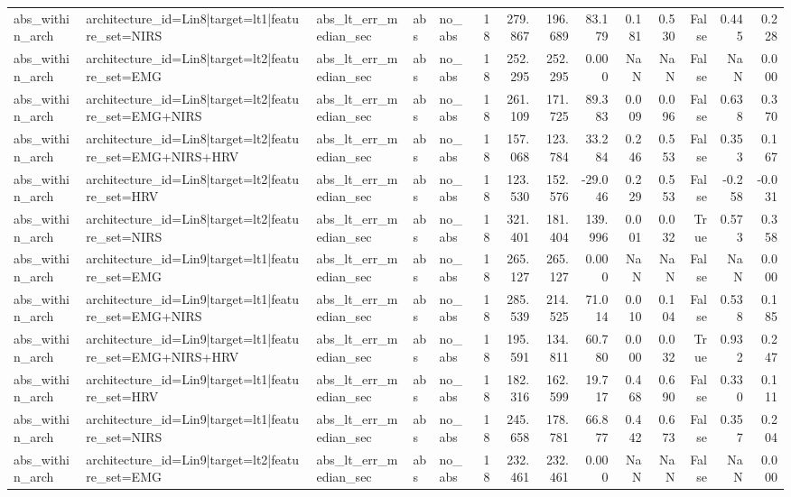 \begin{table}
\begin{tabular}{lllllrrrrrrrrr}
abs_within_arch & architecture_id=Lin8|target=lt1|feature_set=NIRS & abs_lt_err_median_sec & abs & no_abs & 18 & 279.867 & 196.689 & 83.179 & 0.181 & 0.530 & False & 0.445 & 0.228 \\
abs_within_arch & architecture_id=Lin8|target=lt2|feature_set=EMG & abs_lt_err_median_sec & abs & no_abs & 18 & 252.295 & 252.295 & 0.000 & NaN & NaN & False & NaN & 0.000 \\
abs_within_arch & architecture_id=Lin8|target=lt2|feature_set=EMG+NIRS & abs_lt_err_median_sec & abs & no_abs & 18 & 261.109 & 171.725 & 89.383 & 0.009 & 0.096 & False & 0.638 & 0.370 \\
abs_within_arch & architecture_id=Lin8|target=lt2|feature_set=EMG+NIRS+HRV & abs_lt_err_median_sec & abs & no_abs & 18 & 157.068 & 123.784 & 33.284 & 0.246 & 0.553 & False & 0.353 & 0.167 \\
abs_within_arch & architecture_id=Lin8|target=lt2|feature_set=HRV & abs_lt_err_median_sec & abs & no_abs & 18 & 123.530 & 152.576 & -29.046 & 0.229 & 0.553 & False & -0.258 & -0.031 \\
abs_within_arch & architecture_id=Lin8|target=lt2|feature_set=NIRS & abs_lt_err_median_sec & abs & no_abs & 18 & 321.401 & 181.404 & 139.996 & 0.001 & 0.032 & True & 0.573 & 0.358 \\
abs_within_arch & architecture_id=Lin9|target=lt1|feature_set=EMG & abs_lt_err_median_sec & abs & no_abs & 18 & 265.127 & 265.127 & 0.000 & NaN & NaN & False & NaN & 0.000 \\
abs_within_arch & architecture_id=Lin9|target=lt1|feature_set=EMG+NIRS & abs_lt_err_median_sec & abs & no_abs & 18 & 285.539 & 214.525 & 71.014 & 0.010 & 0.104 & False & 0.538 & 0.185 \\
abs_within_arch & architecture_id=Lin9|target=lt1|feature_set=EMG+NIRS+HRV & abs_lt_err_median_sec & abs & no_abs & 18 & 195.591 & 134.811 & 60.780 & 0.000 & 0.032 & True & 0.932 & 0.247 \\
abs_within_arch & architecture_id=Lin9|target=lt1|feature_set=HRV & abs_lt_err_median_sec & abs & no_abs & 18 & 182.316 & 162.599 & 19.717 & 0.468 & 0.690 & False & 0.330 & 0.111 \\
abs_within_arch & architecture_id=Lin9|target=lt1|feature_set=NIRS & abs_lt_err_median_sec & abs & no_abs & 18 & 245.658 & 178.781 & 66.877 & 0.442 & 0.673 & False & 0.357 & 0.204 \\
abs_within_arch & architecture_id=Lin9|target=lt2|feature_set=EMG & abs_lt_err_median_sec & abs & no_abs & 18 & 232.461 & 232.461 & 0.000 & NaN & NaN & False & NaN & 0.000 \\

\end{tabular}
\end{table}
